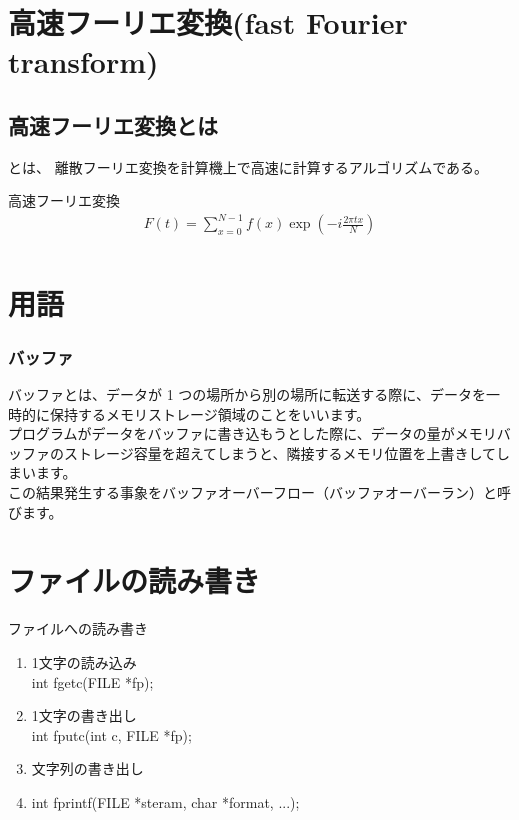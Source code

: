 \documentclass[a4paper]{jsarticle}
\begin{document}
\section{高速フーリエ変換(fast Fourier transform)}
\subsection{高速フーリエ変換とは}
とは、
離散フーリエ変換を計算機上で高速に計算するアルゴリズムである。
\begin{itembox}[l]{高速フーリエ変換}
\begin{eqnarray*}
    F\left(t\right) = \sum^{N-1}_{x=0}f\left(x\right) \exp\left(-i\frac{2 \pi tx}{N}\right)\\
\end{eqnarray*}
\end{itembox}

\section{用語}
\subsubsection*{バッファ}
バッファとは、データが 1 つの場所から別の場所に転送する際に、データを一時的に保持するメモリストレージ領域のことをいいます。\\
プログラムがデータをバッファに書き込もうとした際に、データの量がメモリバッファのストレージ容量を超えてしまうと、隣接するメモリ位置を上書きしてしまいます。\\
この結果発生する事象をバッファオーバーフロー（バッファオーバーラン）と呼びます。\\
\section{ファイルの読み書き}

\begin{itembox}[l]{ファイルへの読み書き}
    \begin{enumerate}[(1)]
        \item 1文字の読み込み\\
              int fgetc(FILE *fp);
        \item 1文字の書き出し\\
              int fputc(int c, FILE *fp);
        \item 文字列の書き出し\\
        \item int fprintf(FILE *steram, char *format, ...);
    \end{enumerate}
\end{itembox}
\end{document}
